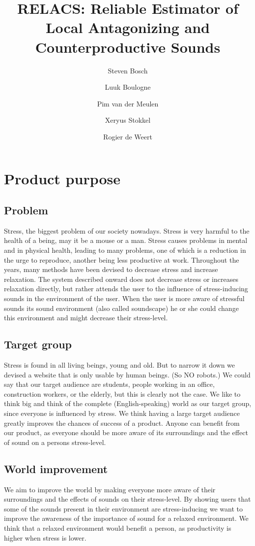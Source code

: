 \documentclass[a4paper]{article}
\title{{RELACS: Reliable Estimator of Local Antagonizing and Counterproductive Sounds}}
\author{Steven Bosch \and Luuk Boulogne \and Pim van der Meulen \and Xeryus Stokkel  \and Rogier de Weert}
\begin{document}
\maketitle

\section{Product purpose}

\subsection{Problem}
Stress, the biggest problem of our society nowadays. Stress is very harmful to the health of a being, may it be a mouse or a man.
Stress causes problems in mental and in physical health, leading to many problems, one of which is a reduction in the urge to reproduce, another being less productive at work. 
Throughout the years, many methods have been devised to decrease stress and increase relaxation. 
The system described onward does not decrease stress or increases relaxation directly, but rather attends the user to the influence of stress-inducing sounds in the environment of the user.
When the user is more aware of stressful sounds its sound environment (also called soundscape) he or she could change this environment and might decrease their stress-level.

\subsection{Target group}
Stress is found in all living beings, young and old. But to narrow it down we devised a website that is only usable by human beings. 
(So NO robots.)
We could say that our target audience are students, people working in an office, construction workers, or the elderly, but this is clearly not the case. 
We like to think big and think of the complete (English-speaking) world as our target group, since everyone is influenced by stress. 
We think having a large target audience greatly improves the chances of success of a product. 
Anyone can benefit from our product, as everyone should be more aware of its surroundings and the effect of sound on a persons stress-level. 

\subsection{World improvement}
We aim to improve the world by making everyone more aware of their surroundings and the effects of sounds on their stress-level. 
By showing users that some of the sounds present in their environment are stress-inducing we want to improve the awareness of the importance of sound for a relaxed environment. 
We think that a relaxed environment would benefit a person, as productivity is higher when stress is lower.
\end{document}
